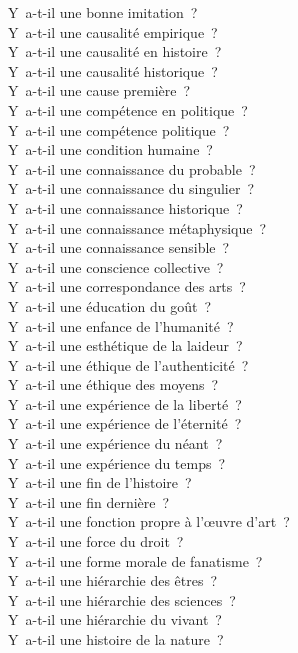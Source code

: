 \documentclass[a4paper,12pt]{article}
\begin{document}
Y a-t-il une bonne imitation ? \\
Y a-t-il une causalité empirique ? \\
Y a-t-il une causalité en histoire ? \\
Y a-t-il une causalité historique ? \\
Y a-t-il une cause première ? \\
Y a-t-il une compétence en politique ? \\
Y a-t-il une compétence politique ? \\
Y a-t-il une condition humaine ? \\
Y a-t-il une connaissance du probable ? \\
Y a-t-il une connaissance du singulier ? \\
Y a-t-il une connaissance historique ? \\
Y a-t-il une connaissance métaphysique ? \\
Y a-t-il une connaissance sensible ? \\
Y a-t-il une conscience collective ? \\
Y a-t-il une correspondance des arts ? \\
Y a-t-il une éducation du goût ? \\
Y a-t-il une enfance de l'humanité ? \\
Y a-t-il une esthétique de la laideur ? \\
Y a-t-il une éthique de l'authenticité ? \\
Y a-t-il une éthique des moyens ? \\
Y a-t-il une expérience de la liberté ? \\
Y a-t-il une expérience de l'éternité ? \\
Y a-t-il une expérience du néant ? \\
Y a-t-il une expérience du temps ? \\
Y a-t-il une fin de l'histoire ? \\
Y a-t-il une fin dernière ? \\
Y a-t-il une fonction propre à l'œuvre d'art ? \\
Y a-t-il une force du droit ? \\
Y a-t-il une forme morale de fanatisme ? \\
Y a-t-il une hiérarchie des êtres ? \\
Y a-t-il une hiérarchie des sciences ? \\
Y a-t-il une hiérarchie du vivant ? \\
Y a-t-il une histoire de la nature ? \\
\end{document}

